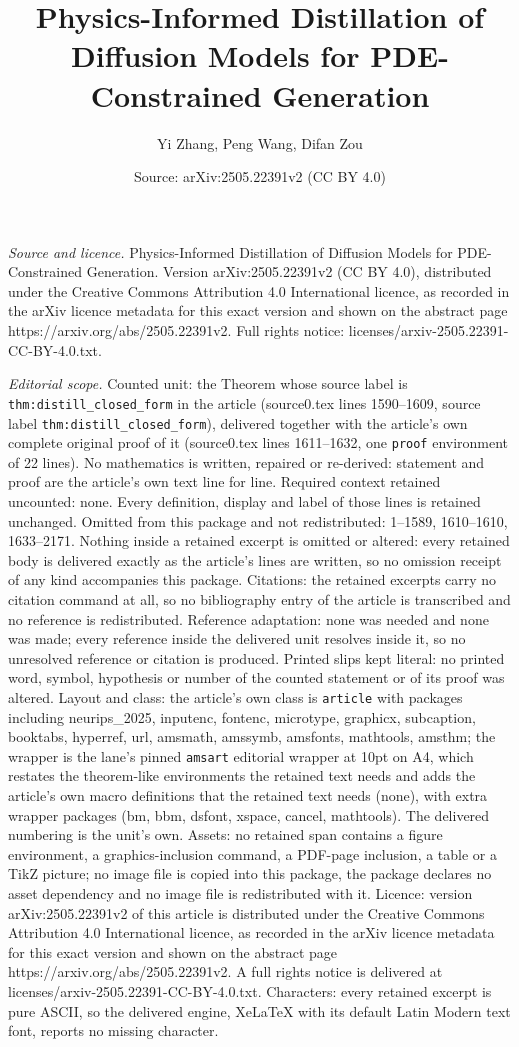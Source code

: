 \documentclass[10pt,a4paper]{amsart}
\title[Physics-Informed Distillation of Diffusion Models for PDE-Co]{Physics-Informed Distillation of Diffusion Models for PDE-Constrained Generation}
\author{Yi Zhang, Peng Wang, Difan Zou}
\date{Source: arXiv:2505.22391v2 (CC BY 4.0)}
\begin{document}
\maketitle

\noindent\emph{Source and licence.} Physics-Informed Distillation of Diffusion Models for PDE-Constrained Generation. Version arXiv:2505.22391v2 (CC BY 4.0), distributed under the Creative Commons Attribution 4.0 International licence, as recorded in the arXiv licence metadata for this exact version and shown on the abstract page https://arxiv.org/abs/2505.22391v2. Full rights notice: licenses/arxiv-2505.22391-CC-BY-4.0.txt.\par\smallskip

\noindent\textit{Editorial scope.} Counted unit: the Theorem whose source label is \texttt{thm:distill\_closed\_form} in the article (source0.tex lines 1590--1609, source label \texttt{thm:distill\_closed\_form}), delivered together with the article's own complete original proof of it (source0.tex lines 1611--1632, one \texttt{proof} environment of 22 lines). No mathematics is written, repaired or re-derived: statement and proof are the article's own text line for line. Required context retained uncounted: none. Every definition, display and label of those lines is retained unchanged. Omitted from this package and not redistributed: 1--1589, 1610--1610, 1633--2171. Nothing inside a retained excerpt is omitted or altered: every retained body is delivered exactly as the article's lines are written, so no omission receipt of any kind accompanies this package. Citations: the retained excerpts carry no citation command at all, so no bibliography entry of the article is transcribed and no reference is redistributed. Reference adaptation: none was needed and none was made; every reference inside the delivered unit resolves inside it, so no unresolved reference or citation is produced. Printed slips kept literal: no printed word, symbol, hypothesis or number of the counted statement or of its proof was altered. Layout and class: the article's own class is \texttt{article} with packages including neurips\_2025, inputenc, fontenc, microtype, graphicx, subcaption, booktabs, hyperref, url, amsmath, amssymb, amsfonts, mathtools, amsthm; the wrapper is the lane's pinned \texttt{amsart} editorial wrapper at 10pt on A4, which restates the theorem-like environments the retained text needs and adds the article's own macro definitions that the retained text needs (none), with extra wrapper packages (bm, bbm, dsfont, xspace, cancel, mathtools). The delivered numbering is the unit's own. Assets: no retained span contains a figure environment, a graphics-inclusion command, a PDF-page inclusion, a table or a TikZ picture; no image file is copied into this package, the package declares no asset dependency and no image file is redistributed with it. Licence: version arXiv:2505.22391v2 of this article is distributed under the Creative Commons Attribution 4.0 International licence, as recorded in the arXiv licence metadata for this exact version and shown on the abstract page https://arxiv.org/abs/2505.22391v2. A full rights notice is delivered at licenses/arxiv-2505.22391-CC-BY-4.0.txt. Characters: every retained excerpt is pure ASCII, so the delivered engine, XeLaTeX with its default Latin Modern text font, reports no missing character.
\end{document}
